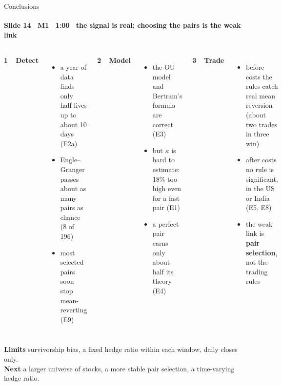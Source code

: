 \begin{frame}{Conclusions}
\framesubtitle{Slide 14 \textbullet\ M1 \textbullet\ 1:00 \textbullet\ the signal is real; choosing the pairs is the weak link}
\vspace{-2pt}
\footnotesize
\begin{columns}[T,onlytextwidth]
  \textbf{\color{deckAccent}1\ \ Detect}
  \begin{itemize}\setlength{\itemsep}{1pt}
    \item a year of data finds only half-lives up to about 10 days (E2a)
    \item Engle--Granger passes about as many pairs as chance (8 of 196)
    \item most selected pairs soon stop mean-reverting (E9)
  \end{itemize}
  \textbf{\color{deckAccent}2\ \ Model}
  \begin{itemize}\setlength{\itemsep}{1pt}
    \item the OU model and Bertram's formula are correct (E3)
    \item but $\kappa$ is hard to estimate: 18\% too high even for a fast pair (E1)
    \item a perfect pair earns only about half its theory (E4)
  \end{itemize}
  \textbf{\color{deckAccent}3\ \ Trade}
  \begin{itemize}\setlength{\itemsep}{1pt}
    \item before costs the rules catch real mean reversion (about two trades in three win)
    \item after costs no rule is significant, in the US or India (E5, E8)
    \item the weak link is \textbf{pair selection}, not the trading rules
  \end{itemize}
\end{columns}
\vspace{4pt}
\scriptsize\textbf{\color{deckAccent}Limits}\; survivorship bias, a fixed hedge ratio within each window, daily closes only.\\
\textbf{\color{deckAccent}Next}\; a larger universe of stocks, a more stable pair selection, a time-varying hedge ratio.
\end{frame}
